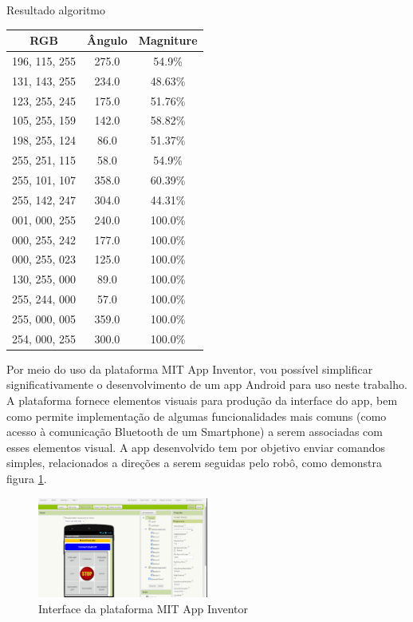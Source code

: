 \begin{quadro}[htb]
	\caption{\label{HSV_resultado}Resultado algoritmo}
		 \begin{tabular}{|c|c|c|}
			\hline
			\textbf{RGB} & \textbf{Ângulo} & \textbf{Magniture} \\ \hline
			196, 115, 255 & 275.0 & 54.9\% \\ \hline
			131, 143, 255 & 234.0 & 48.63\% \\ \hline
			123, 255, 245 & 175.0 & 51.76\% \\ \hline
			105, 255, 159 & 142.0 & 58.82\% \\ \hline
			198, 255, 124 & 86.0 & 51.37\% \\ \hline
			255, 251, 115 & 58.0 & 54.9\% \\ \hline
			255, 101, 107 & 358.0 & 60.39\% \\ \hline
			255, 142, 247 & 304.0 & 44.31\% \\ \hline
			001, 000, 255 & 240.0 & 100.0\% \\ \hline
			000, 255, 242 & 177.0 & 100.0\% \\ \hline
			000, 255, 023 & 125.0 & 100.0\% \\ \hline
			130, 255, 000 & 89.0 & 100.0\% \\ \hline
			255, 244, 000 & 57.0 & 100.0\% \\ \hline
			255, 000, 005 & 359.0 & 100.0\% \\ \hline
			254, 000, 255 & 300.0 & 100.0\% \\ \hline
		\end{tabular}
	\end{quadro}

Por meio do uso da plataforma MIT App Inventor, vou possível simplificar significativamente o desenvolvimento de um app
Android para uso neste trabalho. A plataforma fornece elementos visuais para produção da interface do app, bem como 
permite implementação de algumas funcionalidades mais comuns (como acesso à comunicação Bluetooth de um Smartphone) a 
serem associadas com esses elementos visual. A app desenvolvido tem por objetivo enviar comandos simples, relacionados
a direções a serem seguidas pelo robô, como demonstra figura \ref{fig:mit_app_inventor}.

\begin{figure}[htb]
	\centering
	\includegraphics[width=0.5\textwidth]{figures/mit_app_inventor.png}
	\caption{Interface da plataforma MIT App Inventor}
	\label{fig:mit_app_inventor}
\end{figure}